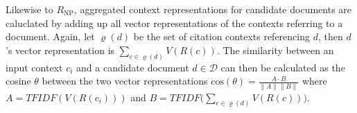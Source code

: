 Likewise to ${R_{\text{NP}}}$, aggregated context representations for candidate documents are caluclated by adding up all vector representations of the contexts referring to a document. Again, let $\varrho(d)$ be the set of citation contexts referencing $d$, then $d$'s vector representation is $\sum\limits_{c \in \varrho(d)} V(R(c))$. The similarity between an input context $c_i$ and a candidate document $d\in \mathcal{D}$ can then be calculated as the cosine $\theta$ between the two vector representations ${\mathrm{cos}(\theta)=\frac{A\cdot B}{\|A\| \|B\|}}$ where  $A=\mathit{TFIDF}(V(R(c_i)))$ and $B=\mathit{TFIDF}\Big(\sum\limits_{c \in \varrho(d)} V(R(c))\Big)$.



